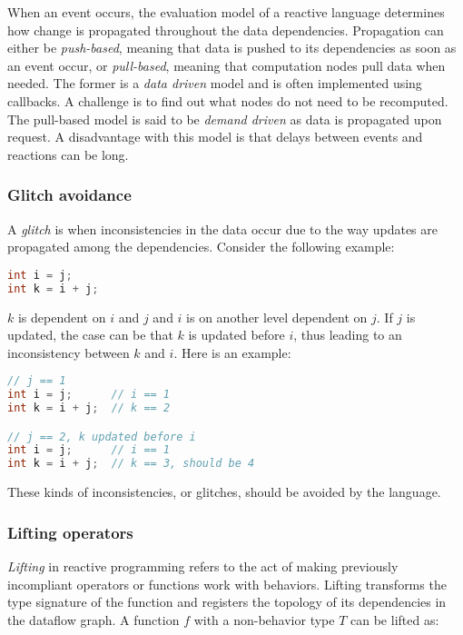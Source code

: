 When an event occurs, the evaluation model of a reactive language determines
how change is propagated throughout the data dependencies. Propagation can
either be \textit{push-based}, meaning that data is pushed to its dependencies
as soon as an event occur, or \textit{pull-based}, meaning that computation
nodes pull data when needed. The former is a \textit{data driven} model and is
often implemented using callbacks. A challenge is to find out what nodes do not
need to be recomputed. The pull-based model is said to be \textit{demand
driven} as data is propagated upon request. A disadvantage with this model is
that delays between events and reactions can be long.

\subsubsection{Glitch avoidance}

A \textit{glitch} is when inconsistencies in the data occur due to the way
updates are propagated among the dependencies. Consider the following example:

\begin{lstlisting}[language=C]
int i = j;
int k = i + j;
\end{lstlisting}

$k$ is dependent on $i$ and $j$ and $i$ is on another level dependent on
$j$. If $j$ is updated, the case can be that $k$ is updated before $i$, thus
leading to an inconsistency between $k$ and $i$. Here is an example:


\begin{lstlisting}[language=C]
// j == 1
int i = j;      // i == 1
int k = i + j;  // k == 2

// j == 2, k updated before i
int i = j;      // i == 1
int k = i + j;  // k == 3, should be 4
\end{lstlisting}

These kinds of inconsistencies, or glitches, should be avoided by the language.

\subsubsection{Lifting operators}

\textit{Lifting} in reactive programming refers to the act of making previously
incompliant operators or functions work with behaviors. Lifting transforms the
type signature of the function and registers the topology of its dependencies
in the dataflow graph. A function $f$ with a non-behavior type $T$ can be
lifted as:

